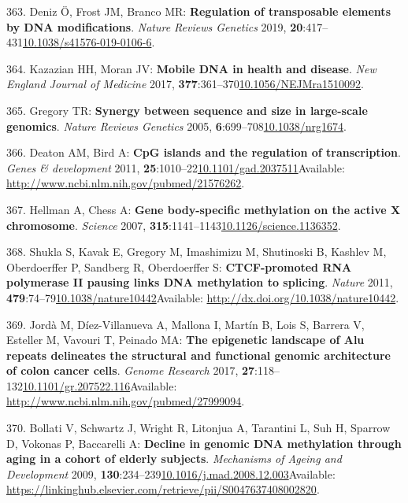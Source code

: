 \documentclass[
]{book}
\begin{document}
\leavevmode\hypertarget{ref-Deniz2019}{}%
363. Deniz Ö, Frost JM, Branco MR: \textbf{Regulation of transposable elements by DNA modifications}. \emph{Nature Reviews Genetics} 2019, \textbf{20}:417--431\href{https://doi.org/10.1038/s41576-019-0106-6}{10.1038/s41576-019-0106-6}.

\leavevmode\hypertarget{ref-Kazazian2017}{}%
364. Kazazian HH, Moran JV: \textbf{Mobile DNA in health and disease}. \emph{New England Journal of Medicine} 2017, \textbf{377}:361--370\href{https://doi.org/10.1056/NEJMra1510092}{10.1056/NEJMra1510092}.

\leavevmode\hypertarget{ref-Gregory2005}{}%
365. Gregory TR: \textbf{Synergy between sequence and size in large-scale genomics}. \emph{Nature Reviews Genetics} 2005, \textbf{6}:699--708\href{https://doi.org/10.1038/nrg1674}{10.1038/nrg1674}.

\leavevmode\hypertarget{ref-Deaton2011}{}%
366. Deaton AM, Bird A: \textbf{CpG islands and the regulation of transcription}. \emph{Genes \& development} 2011, \textbf{25}:1010--22\href{https://doi.org/10.1101/gad.2037511}{10.1101/gad.2037511}Available: \url{http://www.ncbi.nlm.nih.gov/pubmed/21576262}.

\leavevmode\hypertarget{ref-Hellman2007}{}%
367. Hellman A, Chess A: \textbf{Gene body-specific methylation on the active X chromosome}. \emph{Science} 2007, \textbf{315}:1141--1143\href{https://doi.org/10.1126/science.1136352}{10.1126/science.1136352}.

\leavevmode\hypertarget{ref-Shukla2011}{}%
368. Shukla S, Kavak E, Gregory M, Imashimizu M, Shutinoski B, Kashlev M, Oberdoerffer P, Sandberg R, Oberdoerffer S: \textbf{CTCF-promoted RNA polymerase II pausing links DNA methylation to splicing}. \emph{Nature} 2011, \textbf{479}:74--79\href{https://doi.org/10.1038/nature10442}{10.1038/nature10442}Available: \url{http://dx.doi.org/10.1038/nature10442}.

\leavevmode\hypertarget{ref-Jorda2017}{}%
369. Jordà M, Díez-Villanueva A, Mallona I, Martín B, Lois S, Barrera V, Esteller M, Vavouri T, Peinado MA: \textbf{The epigenetic landscape of Alu repeats delineates the structural and functional genomic architecture of colon cancer cells}. \emph{Genome Research} 2017, \textbf{27}:118--132\href{https://doi.org/10.1101/gr.207522.116}{10.1101/gr.207522.116}Available: \url{http://www.ncbi.nlm.nih.gov/pubmed/27999094}.

\leavevmode\hypertarget{ref-Bollati2010}{}%
370. Bollati V, Schwartz J, Wright R, Litonjua A, Tarantini L, Suh H, Sparrow D, Vokonas P, Baccarelli A: \textbf{Decline in genomic DNA methylation through aging in a cohort of elderly subjects}. \emph{Mechanisms of Ageing and Development} 2009, \textbf{130}:234--239\href{https://doi.org/10.1016/j.mad.2008.12.003}{10.1016/j.mad.2008.12.003}Available: \url{https://linkinghub.elsevier.com/retrieve/pii/S0047637408002820}.
\end{document}
